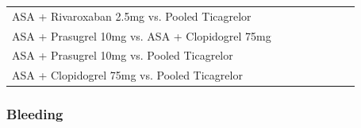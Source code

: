 \documentclass[
  12pt,
]{article}
\begin{document}
\begin{landscape}
\begin{table}[!h]
{\begin{tabular}[t]{llllllll}
ASA + Rivaroxaban 2.5mg vs. Pooled Ticagrelor & \cellcolor[HTML]{5CA881}{\textcolor{white}{No concerns}} & \cellcolor[HTML]{E7B03C}{\textcolor{white}{Suspected}} & \cellcolor[HTML]{5CA881}{\textcolor{white}{No concerns}} & \cellcolor[HTML]{5CA881}{\textcolor{white}{No concerns}} & \cellcolor[HTML]{B5B5B5}{Not applicable} & \cellcolor[HTML]{EA4025}{\textcolor{white}{Major concerns}} & \cellcolor[HTML]{EA4025}{\textcolor{white}{Low}}\\
ASA + Prasugrel 10mg vs. ASA + Clopidogrel 75mg & \cellcolor[HTML]{5CA881}{\textcolor{white}{No concerns}} & \cellcolor[HTML]{5CA881}{\textcolor{white}{Undetected}} & \cellcolor[HTML]{5CA881}{\textcolor{white}{No concerns}} & \cellcolor[HTML]{5CA881}{\textcolor{white}{No concerns}} & \cellcolor[HTML]{B5B5B5}{Not applicable} & \cellcolor[HTML]{EA4025}{\textcolor{white}{Major concerns}} & \cellcolor[HTML]{EA4025}{\textcolor{white}{Low}}\\
ASA + Prasugrel 10mg vs. Pooled Ticagrelor & \cellcolor[HTML]{5CA881}{\textcolor{white}{No concerns}} & \cellcolor[HTML]{E7B03C}{\textcolor{white}{Suspected}} & \cellcolor[HTML]{5CA881}{\textcolor{white}{No concerns}} & \cellcolor[HTML]{5CA881}{\textcolor{white}{No concerns}} & \cellcolor[HTML]{B5B5B5}{Not applicable} & \cellcolor[HTML]{EA4025}{\textcolor{white}{Major concerns}} & \cellcolor[HTML]{EA4025}{\textcolor{white}{Low}}\\
\addlinespace
ASA + Clopidogrel 75mg vs. Pooled Ticagrelor & \cellcolor[HTML]{5CA881}{\textcolor{white}{No concerns}} & \cellcolor[HTML]{E7B03C}{\textcolor{white}{Suspected}} & \cellcolor[HTML]{5CA881}{\textcolor{white}{No concerns}} & \cellcolor[HTML]{E7B03C}{\textcolor{white}{Some concerns}} & \cellcolor[HTML]{B5B5B5}{Not applicable} & \cellcolor[HTML]{EA4025}{\textcolor{white}{Major concerns}} & \cellcolor[HTML]{A32A31}{\textcolor{white}{Very Low}}\\
\bottomrule
\end{tabular}}
\end{table}

\newpage

\hypertarget{bleeding-1}{%
\subsubsection{Bleeding}\label{bleeding-1}}


\end{landscape}
\end{document}
